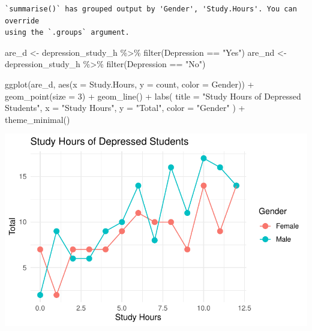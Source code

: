 \documentclass[
  letterpaper,
  DIV=11,
  numbers=noendperiod]{scrartcl}
\newenvironment{Shaded}{\begin{snugshade}}{\end{snugshade}}
\newcommand{\AttributeTok}[1]{\textcolor[rgb]{0.40,0.45,0.13}{#1}}
\newcommand{\DecValTok}[1]{\textcolor[rgb]{0.68,0.00,0.00}{#1}}
\newcommand{\FunctionTok}[1]{\textcolor[rgb]{0.28,0.35,0.67}{#1}}
\newcommand{\NormalTok}[1]{\textcolor[rgb]{0.00,0.23,0.31}{#1}}
\newcommand{\OtherTok}[1]{\textcolor[rgb]{0.00,0.23,0.31}{#1}}
\newcommand{\SpecialCharTok}[1]{\textcolor[rgb]{0.37,0.37,0.37}{#1}}
\newcommand{\StringTok}[1]{\textcolor[rgb]{0.13,0.47,0.30}{#1}}
\begin{document}
\begin{verbatim}
`summarise()` has grouped output by 'Gender', 'Study.Hours'. You can override
using the `.groups` argument.
\end{verbatim}

\begin{Shaded}
\begin{Highlighting}[]
\NormalTok{are\_d }\OtherTok{\textless{}{-}}\NormalTok{ depression\_study\_h }\SpecialCharTok{\%\textgreater{}\%} \FunctionTok{filter}\NormalTok{(Depression }\SpecialCharTok{==} \StringTok{"Yes"}\NormalTok{)}
\NormalTok{are\_nd }\OtherTok{\textless{}{-}}\NormalTok{ depression\_study\_h }\SpecialCharTok{\%\textgreater{}\%} \FunctionTok{filter}\NormalTok{(Depression }\SpecialCharTok{==} \StringTok{"No"}\NormalTok{)}

\FunctionTok{ggplot}\NormalTok{(are\_d, }\FunctionTok{aes}\NormalTok{(}\AttributeTok{x =}\NormalTok{ Study.Hours, }\AttributeTok{y =}\NormalTok{ count, }\AttributeTok{color =}\NormalTok{ Gender)) }\SpecialCharTok{+}
  \FunctionTok{geom\_point}\NormalTok{(}\AttributeTok{size =} \DecValTok{3}\NormalTok{) }\SpecialCharTok{+}    
  \FunctionTok{geom\_line}\NormalTok{() }\SpecialCharTok{+}       
  \FunctionTok{labs}\NormalTok{(}
    \AttributeTok{title =} \StringTok{"Study Hours of Depressed Students"}\NormalTok{,}
    \AttributeTok{x =} \StringTok{"Study Hours"}\NormalTok{,}
    \AttributeTok{y =} \StringTok{"Total"}\NormalTok{,}
    \AttributeTok{color =} \StringTok{"Gender"}
\NormalTok{  ) }\SpecialCharTok{+}
  \FunctionTok{theme\_minimal}\NormalTok{() }
\end{Highlighting}
\end{Shaded}

\includegraphics{Data_files/figure-pdf/unnamed-chunk-9-1.pdf}
\end{document}
